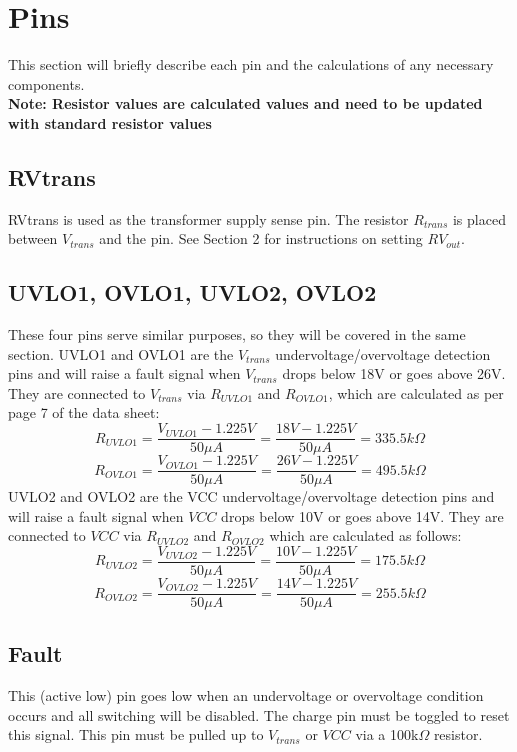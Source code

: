 \documentclass{article}
\begin{document}
	\section{Pins}
	This section will briefly describe each pin and the calculations of any necessary components.\\
	
	\noindent \textbf{Note: Resistor values are calculated values and need to be updated with standard resistor values}
	
	\subsection{RVtrans}
	RVtrans is used as the transformer supply sense pin. The resistor $R_{trans}$ is placed between $V_{trans}$ and the pin. See Section 2 for instructions on setting $RV_{out}$.
	
	\subsection{UVLO1, OVLO1, UVLO2, OVLO2}
	These four pins serve similar purposes, so they will be covered in the same section. UVLO1 and OVLO1 are the $V_{trans}$ undervoltage/overvoltage detection pins and will raise a fault signal when $V_{trans}$ drops below 18V or goes above 26V. They are connected to $V_{trans}$ via $R_{UVLO1}$ and $R_{OVLO1}$, which are calculated as per page 7 of the data sheet:
	\[R_{UVLO1} = \dfrac{V_{UVLO1} - 1.225V}{50\mu A} = \dfrac{18V - 1.225V}{50\mu A} = 335.5k\Omega\]
	\[R_{OVLO1} = \dfrac{V_{OVLO1} - 1.225V}{50\mu A} = \dfrac{26V - 1.225V}{50\mu A} = 495.5k\Omega\]
	UVLO2 and OVLO2 are the VCC undervoltage/overvoltage detection pins and will raise a fault signal when $VCC$ drops below 10V or goes above 14V. They are connected to $VCC$ via $R_{UVLO2}$ and $R_{OVLO2}$ which are calculated as follows:
	\[R_{UVLO2} = \dfrac{V_{UVLO2} - 1.225V}{50\mu A} = \dfrac{10V - 1.225V}{50\mu A} = 175.5k\Omega\]
	\[R_{OVLO2} = \dfrac{V_{OVLO2} - 1.225V}{50\mu A} = \dfrac{14V - 1.225V}{50\mu A} = 255.5k\Omega\]
	
	\subsection{Fault}
	This (active low) pin goes low when an undervoltage or overvoltage condition occurs and all switching will be disabled. The charge pin must be toggled to reset this signal. This pin must be pulled up to $V_{trans}$ or $VCC$ via a 100k$\Omega$ resistor.
	
\end{document}
